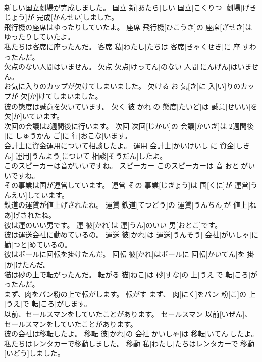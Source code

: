 \documentclass[8pt]{extreport}
\begin{document}
\begin{CJK}{UTF8}{min}
\\	新しい国立劇場が完成しました。	国立	新[あたら]しい 国立[こくりつ] 劇場[げきじょう]が 完成[かんせい]しました。	
\\	飛行機の座席はゆったりしていたよ。	座席	飛行機[ひこうき]の 座席[ざせき]はゆったりしていたよ。	
\\	私たちは客席に座ったんだ。	客席	私[わたし]たちは 客席[きゃくせき]に 座[すわ]ったんだ。	
\\	欠点のない人間はいません。	欠点	欠点[けってん]のない 人間[にんげん]はいません。	
\\	お気に入りのカップが欠けてしまいました。	欠ける	お 気[き]に 入[い]りのカップが 欠[か]けてしまいました。	
\\	彼の態度は誠意を欠いています。	欠く	彼[かれ]の 態度[たいど]は 誠意[せいい]を 欠[か]いています。	
\\	次回の会議は2週間後に行います。	次回	次回[じかい]の 会議[かいぎ]は 2週間後[に しゅうかん ご]に 行[おこな]います。	
\\	会計士に資金運用について相談したよ。	運用	会計士[かいけいし]に 資金[しきん] 運用[うんよう]について 相談[そうだん]したよ。	
\\	このスピーカーは音がいいですね。	スピーカー	このスピーカーは 音[おと]がいいですね。	
\\	その事業は国が運営しています。	運営	その 事業[じぎょう]は 国[くに]が 運営[うんえい]しています。	
\\	鉄道の運賃が値上げされたね。	運賃	鉄道[てつどう]の 運賃[うんちん]が 値上[ねあ]げされたね。	
\\	彼は運のいい男です。	運	彼[かれ]は 運[うん]のいい 男[おとこ]です。	
\\	彼は運送会社に勤めているの。	運送	彼[かれ]は 運送[うんそう] 会社[がいしゃ]に 勤[つと]めているの。	
\\	彼はボールに回転を掛けたんだ。	回転	彼[かれ]はボールに 回転[かいてん]を 掛[か]けたんだ。	
\\	猫は砂の上で転がったんだ。	転がる	猫[ねこ]は 砂[すな]の 上[うえ]で 転[ころ]がったんだ。	
\\	まず、肉をパン粉の上で転がします。	転がす	まず、 肉[にく]をパン 粉[こ]の 上[うえ]で 転[ころ]がします。	
\\	以前、セールスマンをしていたことがあります。	セールスマン	以前[いぜん]、セールスマンをしていたことがあります。	
\\	彼の会社は移転したよ。	移転	彼[かれ]の 会社[かいしゃ]は 移転[いてん]したよ。	
\\	私たちはレンタカーで移動しました。	移動	私[わたし]たちはレンタカーで 移動[いどう]しました。	

\end{CJK}
\end{document}
